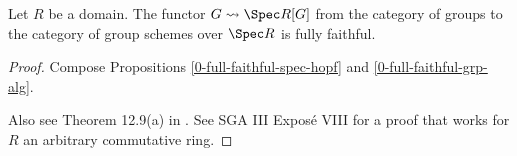 \begin{theorem}
  \label{0-full-faithful-spec-grp-alg}
  \leanok

  Let $R$ be a domain.
  The functor $G \rightsquigarrow \Spec R[G]$ from the category of groups to the category of group schemes over $\Spec R$ is fully faithful.
\end{theorem}
\begin{proof}
  \leanok

  Compose Propositions \ref{0-full-faithful-spec-hopf} and \ref{0-full-faithful-grp-alg}.

  Also see Theorem 12.9(a) in \cite{Milne_2017}. See SGA III Exposé VIII for a proof that works for $R$ an arbitrary commutative ring.
\end{proof}
